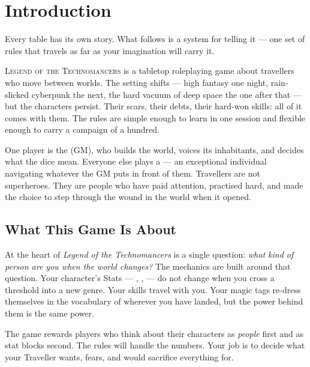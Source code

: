 \chapter{Introduction}
\begin{readaloud}
Every table has its own story. What follows is a system for
telling it --- one set of rules that travels as far as your
imagination will carry it.
\end{readaloud}

\lettrine{L}{egend of the Technomancers} is a tabletop roleplaying
game about travellers who move between worlds. The setting
shifts --- high fantasy one night, rain-slicked cyberpunk the next,
the hard vacuum of deep space the one after that --- but the
characters persist. Their scars, their debts, their hard-won skills:
all of it comes with them. The rules are simple enough to learn
in one session and flexible enough to carry a campaign of a hundred.

One player is the  (GM), who builds the world,
voices its inhabitants, and decides what the dice mean. Everyone
else plays a  --- an exceptional individual
navigating whatever the GM puts in front of them. Travellers are
not superheroes. They are people who have paid attention,
practised hard, and made the choice to step through the wound in
the world when it opened.

\section{What This Game Is About}

At the heart of \emph{Legend of the Technomancers} is a single
question: \emph{what kind of person are you when the world changes?}
The mechanics are built around that question. Your character's
Stats --- , ,  --- do not
change when you cross a threshold into a new genre. Your skills
travel with you. Your magic tags re-dress themselves in the
vocabulary of wherever you have landed, but the power behind them
is the same power.

The game rewards players who think about their characters as
\emph{people} first and as stat blocks second. The rules will handle
the numbers. Your job is to decide what your Traveller wants, fears,
and would sacrifice everything for.

